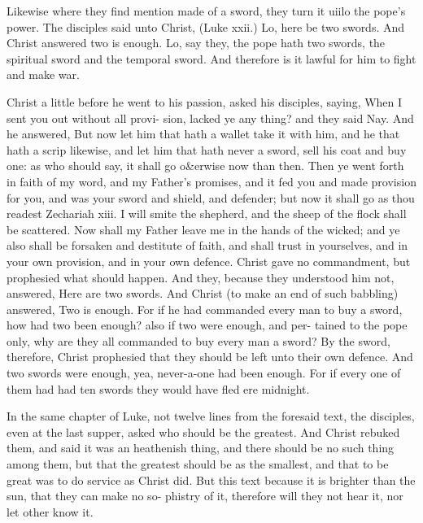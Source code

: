 \documentclass{custom}
\begin{document}
Likewise where they find mention made of a sword, they 
turn it uiilo the pope's power. The disciples said unto 
Christ, (Luke xxii.) Lo, here be two swords. And Christ 
answered two is enough. Lo, say they, the pope 
hath two swords, the spiritual sword and the temporal 
sword. And therefore is it lawful for him to fight and 
make war. 

Christ a little before he went to his passion, asked his 
disciples, saying, When I sent you out without all provi- 
sion, lacked ye any thing? and they said Nay. And he 
answered, But now let him that hath a wallet take it with 
him, and he that hath a scrip likewise, and let him that 
hath never a sword, sell his coat and buy one: as who 
should say, it shall go o&erwise now than then. Then ye 
went forth in faith of my word, and my Father's promises, 
and it fed you and made provision for you, and was your 
sword and shield, and defender; but now it shall go as 
thou readest Zechariah xiii. I will smite the shepherd, and 
the sheep of the flock shall be scattered. Now shall my 
Father leave me in the hands of the wicked; and ye also 
shall be forsaken and destitute of faith, and shall trust in 
yourselves, and in your own provision, and in your own 
defence. Christ gave no commandment, but prophesied 
what should happen. And they, because they understood 
him not, answered, Here are two swords. And Christ (to 
make an end of such babbling) answered, Two is enough. 
For if he had commanded every man to buy a sword, how 
had two been enough? also if two were enough, and per- 
tained to the pope only, why are they all commanded to 
buy every man a sword? By the sword, therefore, Christ 
prophesied that they should be left unto their own defence. 
And two swords were enough, yea, never-a-one had been 
enough. For if every one of them had had ten swords they 
would have fled ere midnight. 

In the same chapter of Luke, not twelve lines from the 
foresaid text, the disciples, even at the last supper, 
asked who should be the greatest. And Christ rebuked 
them, and said it was an heathenish thing, and there 
should be no such thing among them, but that the 
greatest should be as the smallest, and that to be great 
was to do service as Christ did. But this text because 
it is brighter than the sun, that they can make no so- 
phistry of it, therefore will they not hear it, nor let other 
know it. 
\end{document}
